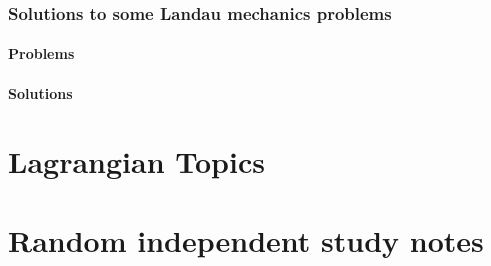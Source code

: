       \section{Solutions to some Landau mechanics problems}
         \subsection{Problems}
            
         \subsection{Solutions}
            \shipoutAnswer
   
\part{Lagrangian Topics}
   
   
   
   
   
   

\part{Random independent study notes}
   
   
   
   
   
   
   
   
   
   
   
   
   


